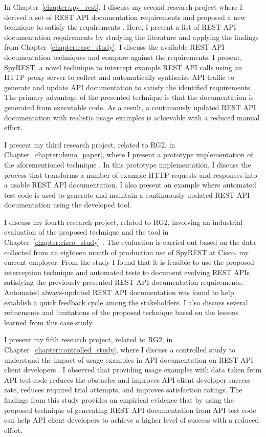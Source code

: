 In Chapter~\ref{chapter:spy_rest}, I discuss my second research project where I derived a set of REST API documentation requirements and proposed a new technique to satisfy the requirements \cite{sohan2015spyrest}. Here, I present a list of REST API documentation requirements by studying the literature and applying the findings from Chapter~\ref{chapter:case_study}. I discuss the available REST API documentation techniques and compare against the requirements. I present, SpyREST, a novel technique to intercept example REST API calls using an HTTP proxy server to collect and automatically synthesize API traffic to generate and update API documentation to satisfy the identified requirements. The primary advantage of the presented technique is that the documentation is generated from executable code. As a result, a continuously updated REST API documentation with realistic usage examples is achievable with a reduced manual effort.

I present my third research project, related to RG2, in Chapter~\ref{chapter:demo_paper}, where I present a prototype implementation of the aforementioned technique \cite{sohan2015spyrest_tool}. In this prototype implementation, I discuss the process that transforms a number of example HTTP requests and responses into a usable REST API documentation. I also present an example where automated test code is used to generate and maintain a continuously updated REST API documentation using the developed tool.

I discuss my fourth research project, related to RG2, involving an industrial evaluation of the proposed technique and the tool in Chapter~\ref{chapter:cisco_study} \cite{sohan_cisco}. The evaluation is carried out based on the data collected from an eighteen month of production use of SpyREST at Cisco, my current employer. From the study I found that it is feasible to use the proposed interception technique and automated tests to document evolving REST APIs satisfying the previously presented REST API documentation requirements. Automated always-updated REST API documentation was found to help establish a quick feedback cycle among the stakeholders. I also discuss several refinements and limitations of the proposed technique based on the lessons learned from this case study.

I present my fifth research project, related to RG2, in Chapter~\ref{chapter:controlled_study}, where I discuss a controlled study to understand the impact of usage examples in API documentation on REST API client developers \cite{sohan_vlhcc}. I observed that providing usage examples with data taken from API test code reduces the obstacles and improves API client developer success rate, reduces required trial attempts, and improves satisfaction ratings. The findings from this study provides an empirical evidence that by using the proposed technique of generating REST API documentation from API test code can help API client developers to achieve a higher level of success with a reduced effort.

